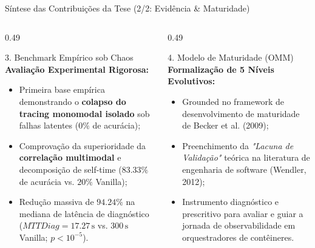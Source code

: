 \documentclass[aspectratio=169, 10pt]{beamer}
\begin{document}
\begin{frame}{Síntese das Contribuições da Tese (2/2: Evidência \& Maturidade)}
  \begin{columns}[T]
    \begin{column}{0.49\textwidth}
      \begin{block}{\large 3. Benchmark Empírico sob Chaos}
        \small
        \textbf{Avaliação Experimental Rigorosa:}
        \begin{itemize}
          \item Primeira base empírica demonstrando o \textbf{colapso do tracing monomodal isolado} sob falhas latentes ($0\%$ de acurácia);
          \item Comprovação da superioridade da \textbf{correlação multimodal} e decomposição de self-time ($\mathbf{83.33\%}$ de acurácia vs. $20\%$ Vanilla);
          \item Redução massiva de $\mathbf{94.24\%}$ na mediana de latência de diagnóstico ($MTTDiag = 17.27\,\text{s}$ vs. $300\,\text{s}$ Vanilla; $p < 10^{-5}$).
        \end{itemize}
      \end{block}
    \end{column}
    
    \begin{column}{0.49\textwidth}
      \begin{block}{\large 4. Modelo de Maturidade (OMM)}
        \small
        \textbf{Formalização de 5 Níveis Evolutivos:}
        \begin{itemize}
          \item Grounded no framework de desenvolvimento de maturidade de Becker et al. (2009);
          \item Preenchimento da \textit{"Lacuna de Validação"} teórica na literatura de engenharia de software (Wendler, 2012);
          \item Instrumento diagnóstico e prescritivo para avaliar e guiar a jornada de observabilidade em orquestradores de contêineres.
        \end{itemize}
      \end{block}
    \end{column}
  \end{columns}
\end{frame}
\end{document}
